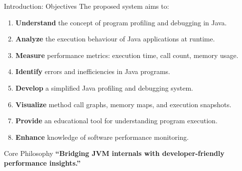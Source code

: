 \documentclass[aspectratio=169]{beamer}
\begin{document}
\begin{frame}{Introduction: Objectives}
The proposed system aims to:
\vspace{0.3cm}
\begin{enumerate}
  \item \textbf{Understand} the concept of program profiling and debugging in Java.
  \item \textbf{Analyze} the execution behaviour of Java applications at runtime.
  \item \textbf{Measure} performance metrics: execution time, call count, memory usage.
  \item \textbf{Identify} errors and inefficiencies in Java programs.
  \item \textbf{Develop} a simplified Java profiling and debugging system.
  \item \textbf{Visualize} method call graphs, memory maps, and execution snapshots.
  \item \textbf{Provide} an educational tool for understanding program execution.
  \item \textbf{Enhance} knowledge of software performance monitoring.
\end{enumerate}
\vspace{0.3cm}
\begin{exampleblock}{Core Philosophy}
\centering\small
\textbf{``Bridging JVM internals with developer-friendly performance insights.''}
\end{exampleblock}
\end{frame}
\end{document}
